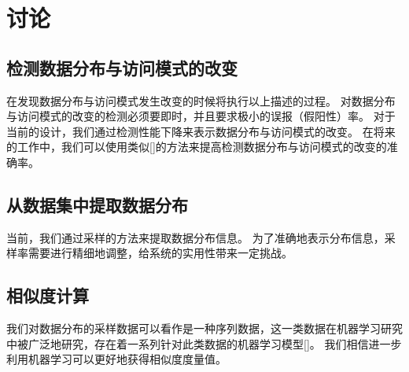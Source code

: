 \section{讨论}

\subsection{检测数据分布与访问模式的改变}

{\sys}在发现数据分布与访问模式发生改变的时候将执行以上描述的过程。
对数据分布与访问模式的改变的检测必须要即时，并且要求极小的误报（假阳性）率。
对于当前的设计，我们通过检测性能下降来表示数据分布与访问模式的改变。
在将来的工作中，我们可以使用类似[]的方法来提高检测数据分布与访问模式的改变的准确率。


\subsection{从数据集中提取数据分布}
当前，我们通过采样的方法来提取数据分布信息。
为了准确地表示分布信息，采样率需要进行精细地调整，给系统的实用性带来一定挑战。


\subsection{相似度计算}
我们对数据分布的采样数据可以看作是一种序列数据，这一类数据在机器学习研究中被广泛地研究，存在着一系列针对此类数据的机器学习模型[]。
我们相信进一步利用机器学习可以更好地获得相似度度量值。


